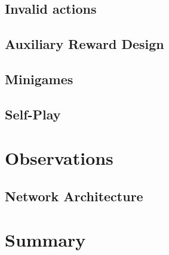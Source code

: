 \documentclass[12pt]{article}
\begin{document}
\subsection{Invalid actions\johannes} %

\subsection{Auxiliary Reward Design\johannes}

\subsection{Minigames\johannes} %

\subsection{Self-Play\johannes} %



\section{Observations}
\subsection{Network Architecture\johannes}




\section{Summary\johannes}




\printbibliography
\end{document}
